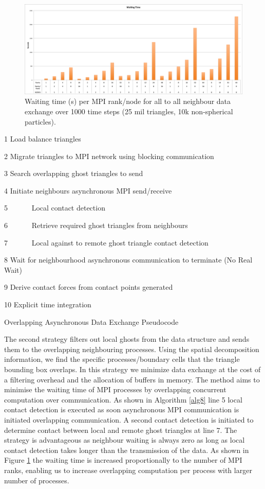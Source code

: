 \documentclass[times,12pt]{article}
\begin{document}
\begin{figure}[!h]
\centering
\includegraphics[width=1\textwidth]{wait} \protect\caption{\label{fig6}Waiting time (s) per MPI rank/node for all to all neighbour data exchange over 1000 time steps (25 mil triangles, 10k non-spherical particles).}
\end{figure}

\begin{algorithm}
1 Load balance triangles

2 Migrate triangles to MPI network using blocking communication

3 Search overlapping ghost triangles to send

4 Initiate neighbours asynchronous MPI send/receive

5 ~~~~~~Local contact detection

6 ~~~~~~Retrieve required ghost triangles from neighbours

7 ~~~~~~Local against to remote ghost triangle contact detection

8 Wait for neighbourhood asynchronous communication to terminate (No Real Wait)

9 Derive contact forces from contact points generated

10 Explicit time integration

\protect\caption{\label{alg8}Overlapping Asynchronous Data Exchange Pseudocode}
\end{algorithm}

The second strategy filters out local ghosts from the data structure and sends them to the overlapping neighbouring processes. Using the spatial decomposition information, we find the specific processes/boundary cells that the triangle bounding box overlaps. In this strategy we minimize data exchange at the cost of a filtering overhead and the allocation of buffers in memory. The method aims to minimise the waiting time of MPI processes by overlapping concurrent computation over communication. As shown in Algorithm \ref{alg8} line 5 local contact detection is executed as soon asynchronous MPI communication is initiated overlapping communication. A second contact detection is initiated to determine contact between local and remote ghost triangles at line 7. The strategy is advantageous as neighbour waiting is always zero as long as local contact detection takes longer than the transmission of the data. As shown in Figure \ref{fig6} the waiting time is increased proportionally to the number of MPI ranks, enabling us to increase overlapping computation per process with larger number of processes.
\end{document}
